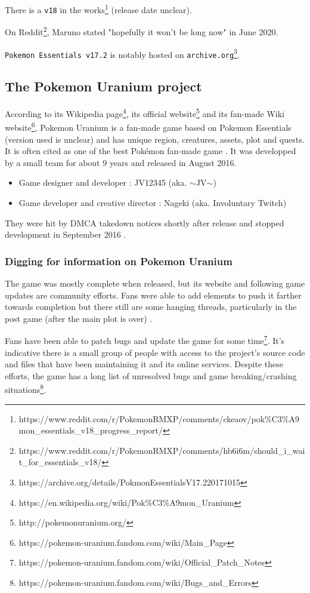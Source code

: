 \documentclass[11pt]{article}
\begin{document}
There is a \texttt{v18} in the works\footnote{https://www.reddit.com/r/PokemonRMXP/comments/ckeaov/pok\%C3\%A9mon\_essentials\_v18\_progress\_report/} (release date unclear). {On Reddit\footnote{https://www.reddit.com/r/PokemonRMXP/comments/hb6i6m/should\_i\_wait\_for\_essentials\_v18/}, Maruno stated "hopefully it won't be long now" in June 2020.

\texttt{Pokemon Essentials v17.2} is notably hosted on \texttt{archive.org}\footnote{https://archive.org/details/PokmonEssentialsV17.220171015}.





\subsection{The Pokemon Uranium project}


According to its Wikipedia page\footnote{https://en.wikipedia.org/wiki/Pok\%C3\%A9mon\_Uranium}, its official website\footnote{http://pokemonuranium.org/} and its fan-made Wiki website\footnote{https://pokemon-uranium.fandom.com/wiki/Main\_Page}, Pokemon Uranium is a fan-made game based on Pokemon Essentials (version used is unclear) and has unique region, creatures, assets, plot and quests. It is often cited as one of the best Pokémon fan-made game \cite{PkmnBestFG, PkmnBestFG2}.
It was developped by a small team for about 9 years and released in August 2016.
\begin{itemize}
	\item Game designer and developer : JV12345 (aka. $\sim$JV$\sim$)
	\item Game developer and creative director : Nageki (aka. Involuntary Twitch)
\end{itemize}
They were hit by DMCA takedown notices shortly after release and stopped development in September 2016 \cite{PUtakedown}.


\subsubsection{Digging for information on Pokemon Uranium}

The game was mostly complete when released, but its website and following game updates are community efforts. Fans were able to add elements to push it farther towards completion but there still are some hanging threads, particularly in the post game (after the main plot is over) \cite{PUsidequests}.

Fans have been able to patch bugs and update the game for some time\footnote{https://pokemon-uranium.fandom.com/wiki/Official\_Patch\_Notes}. It's indicative there is a small group of people with access to the project's source code and files that have been maintaining it and its online services. Despite these efforts, the game has a long list of unresolved bugs and game breaking/crashing situations\footnote{https://pokemon-uranium.fandom.com/wiki/Bugs\_and\_Errors}.
	
}
\end{document}
